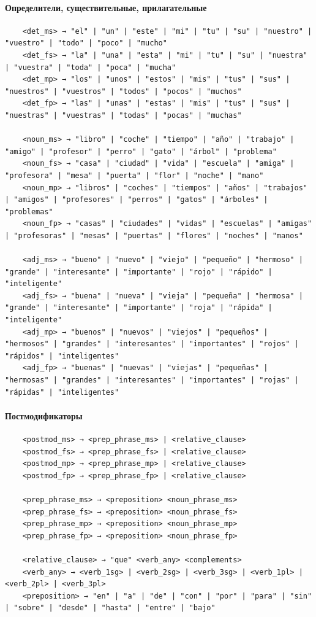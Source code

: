 \documentclass[a4paper,final]{article}
\begin{document}
\paragraph{Определители, существительные, прилагательные}\mbox{}\par
\begin{lstlisting}
    <det_ms> → "el" | "un" | "este" | "mi" | "tu" | "su" | "nuestro" | "vuestro" | "todo" | "poco" | "mucho"
    <det_fs> → "la" | "una" | "esta" | "mi" | "tu" | "su" | "nuestra" | "vuestra" | "toda" | "poca" | "mucha"
    <det_mp> → "los" | "unos" | "estos" | "mis" | "tus" | "sus" | "nuestros" | "vuestros" | "todos" | "pocos" | "muchos"
    <det_fp> → "las" | "unas" | "estas" | "mis" | "tus" | "sus" | "nuestras" | "vuestras" | "todas" | "pocas" | "muchas"
    
    <noun_ms> → "libro" | "coche" | "tiempo" | "año" | "trabajo" | "amigo" | "profesor" | "perro" | "gato" | "árbol" | "problema"
    <noun_fs> → "casa" | "ciudad" | "vida" | "escuela" | "amiga" | "profesora" | "mesa" | "puerta" | "flor" | "noche" | "mano"
    <noun_mp> → "libros" | "coches" | "tiempos" | "años" | "trabajos" | "amigos" | "profesores" | "perros" | "gatos" | "árboles" | "problemas"
    <noun_fp> → "casas" | "ciudades" | "vidas" | "escuelas" | "amigas" | "profesoras" | "mesas" | "puertas" | "flores" | "noches" | "manos"
    
    <adj_ms> → "bueno" | "nuevo" | "viejo" | "pequeño" | "hermoso" | "grande" | "interesante" | "importante" | "rojo" | "rápido" | "inteligente"
    <adj_fs> → "buena" | "nueva" | "vieja" | "pequeña" | "hermosa" | "grande" | "interesante" | "importante" | "roja" | "rápida" | "inteligente"
    <adj_mp> → "buenos" | "nuevos" | "viejos" | "pequeños" | "hermosos" | "grandes" | "interesantes" | "importantes" | "rojos" | "rápidos" | "inteligentes"
    <adj_fp> → "buenas" | "nuevas" | "viejas" | "pequeñas" | "hermosas" | "grandes" | "interesantes" | "importantes" | "rojas" | "rápidas" | "inteligentes"
\end{lstlisting}

\paragraph{Постмодификаторы}\mbox{}\par
\begin{lstlisting}
    <postmod_ms> → <prep_phrase_ms> | <relative_clause>
    <postmod_fs> → <prep_phrase_fs> | <relative_clause>
    <postmod_mp> → <prep_phrase_mp> | <relative_clause>
    <postmod_fp> → <prep_phrase_fp> | <relative_clause>
    
    <prep_phrase_ms> → <preposition> <noun_phrase_ms>
    <prep_phrase_fs> → <preposition> <noun_phrase_fs>
    <prep_phrase_mp> → <preposition> <noun_phrase_mp>
    <prep_phrase_fp> → <preposition> <noun_phrase_fp>
    
    <relative_clause> → "que" <verb_any> <complements>
    <verb_any> → <verb_1sg> | <verb_2sg> | <verb_3sg> | <verb_1pl> | <verb_2pl> | <verb_3pl>
    <preposition> → "en" | "a" | "de" | "con" | "por" | "para" | "sin" | "sobre" | "desde" | "hasta" | "entre" | "bajo"
\end{lstlisting}
\end{document}

